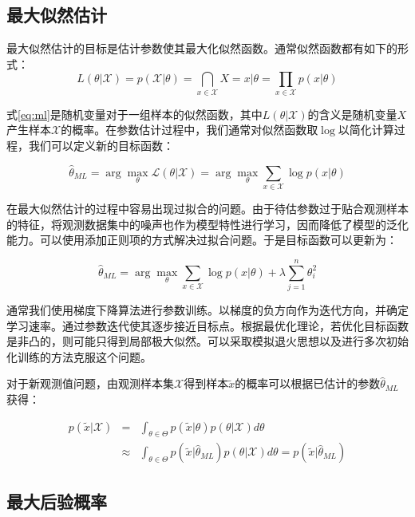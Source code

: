 \subsection{最大似然估计}

最大似然估计的目标是估计参数使其最大化似然函数。通常似然函数都有如下的形式：
\begin{equation}
\label{eq:ml}
	L(\theta|\mathcal{X}) = p(\mathcal{X}|\theta) = \bigcap_{x \in \mathcal{X}}{X=x|\theta} = \prod_{x \in \mathcal{X}}p(x|\theta)
\end{equation}

式\ref{eq:ml}是随机变量对于一组样本的似然函数，其中$L(\theta|\mathcal{X})$的含义是随机变量$X$产生样本$\mathcal{X}$的概率。在参数估计过程中，我们通常对似然函数取$\log$以简化计算过程，我们可以定义新的目标函数：

\begin{equation}
	\hat{\theta}_{ML} = \arg\max_\theta \mathcal{L}(\theta|\mathcal{X}) = \arg\max_\theta \sum_{x \in \mathcal{X}}\log p(x|\theta)
\end{equation}

在最大似然估计的过程中容易出现过拟合的问题。由于待估参数过于贴合观测样本的特征，将观测数据集中的噪声也作为模型特性进行学习，因而降低了模型的泛化能力。可以使用添加正则项的方式解决过拟合问题。于是目标函数可以更新为：

\begin{equation}
	\hat{\theta}_{ML} = \arg\max_\theta \sum_{x \in \mathcal{X}}\log p(x|\theta) + \lambda\sum_{j=1}^n\theta_i^2
\end{equation}

通常我们使用梯度下降算法进行参数训练。以梯度的负方向作为迭代方向，并确定学习速率。通过参数迭代使其逐步接近目标点。根据最优化理论，若优化目标函数是非凸的，则可能只得到局部极大似然。可以采取模拟退火思想以及进行多次初始化训练的方法克服这个问题。

对于新观测值问题，由观测样本集$\mathcal{X}$得到样本$\tilde{x}$的概率可以根据已估计的参数$\hat{\theta}_{ML}$获得：

\begin{eqnarray}
p(\tilde{x}|\mathcal{X})& = &\int_{\theta \in \Theta}p(\tilde{x}|\theta)p(\theta|\mathcal{X})d\theta \nonumber \\
& \approx &\int_{\theta \in \Theta}p(\tilde{x}|\hat{\theta}_{ML})p(\theta|\mathcal{X})d\theta = p(\tilde{x}|\hat{\theta}_{ML})
\end{eqnarray}


\subsection{最大后验概率}

